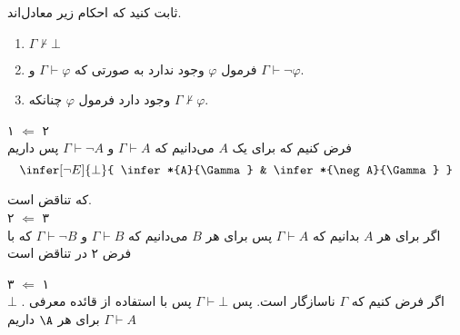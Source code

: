 
		ثابت کنید که احکام زیر معادل‌اند.
		 \begin{enumerate}
		 	\item $\Gamma\nvdash \bot$	
		 	\item فرمول
		 	$\varphi$
		 	وجود ندارد به صورتی که 
		 	$\Gamma \vdash \varphi$ 
		 	و
		 	$\Gamma \vdash \neg \varphi$.
		 	
		 	\item وجود دارد فرمول
			$\varphi$
			چنانکه $\Gamma \nvdash \varphi$.
		 	
		 \end{enumerate}
		 
	\quad\vspace {-0.5 cm}
	\begin{ans}
		۱ $\Leftarrow$ ۲ \\
		 فرض کنیم که برای یک $A$ می‌دانیم که
		 $\Gamma \vdash A$
		 و 
		 $\Gamma \vdash \neg A$
		 پس داریم
		 $$
		 	\infer[\neg E]{\bot}{
		 		\infer*{A}{\Gamma}
		 		&
		 		\infer*{\neg A}{\Gamma}
		 	}	
		 $$ 

که تناقض است.\\
		۲ $\Leftarrow$ ۳ \\
		اگر برای هر 
		$A$
		بدانیم که
		$\Gamma \vdash A$
		پس برای هر 
		$B$
		می‌دانیم که 
		$\Gamma \vdash B$ و
		$\Gamma \vdash \neg B$
		که با فرض ۲ در تناقض است
		
		۳ $\Leftarrow$ ۱ \\
		اگر فرض کنیم که 
  $\Gamma$ 
  ناسازگار است.
  پس
		$\Gamma \vdash \bot$
		پس با استفاده از قائده معرفی . 
  $\bot$
  برای هر
  $\A$
  داریم
		$\Gamma \vdash A$
		 
	\end{ans}
